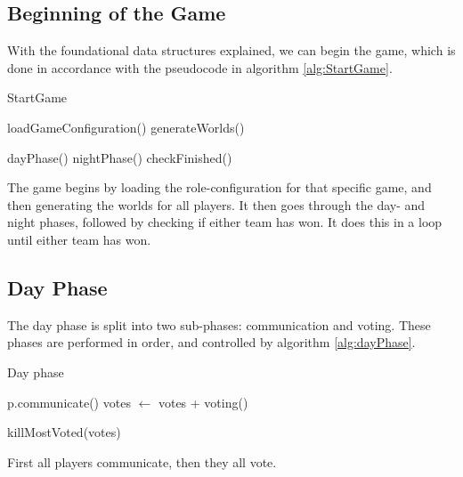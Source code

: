\subsection{Beginning of the Game}\label{sec:beginningOfTheGame}
With the foundational data structures explained, we can begin the game, which 
is done in accordance with the pseudocode in algorithm \ref{alg:StartGame}.
\begin{algorithm}[H]
	\caption{StartGame}
	\begin{algorithmic}[1]
		\State loadGameConfiguration()
		\State generateWorlds()
		
		\State dayPhase()
		\State nightPhase()
		\State checkFinished()
		\EndWhile
		\EndFunction
	\end{algorithmic}\label{alg:StartGame}
\end{algorithm} 
\setcounter{algorithmcaption}{0}
The game begins by loading the role-configuration for that specific game, and 
then generating the worlds for all players. It then goes through the day- and 
night phases, followed by checking if either team has won. It does this in a 
loop until either team has won. 

\subsection{Day Phase}\label{sec:dayPhase}
The day phase is split into two sub-phases: communication and voting. These 
phases are performed in order, and controlled by algorithm \ref{alg:dayPhase}.
\begin{algorithm}[H]
	\caption{Day phase}
	\begin{algorithmic}[1]
		\State p.communicate()
		\EndFor
		\State votes $\gets$ votes + voting()
		\EndFor
		
		\State killMostVoted(votes)
		\EndFunction
	\end{algorithmic}\label{alg:dayPhase}
\end{algorithm}
\setcounter{algorithmcaption}{1}
First all players communicate, then they all vote.

